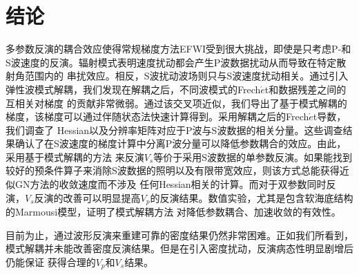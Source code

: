 \section{结论}
多参数反演的耦合效应使得常规梯度方法EFWI受到很大挑战，即使是只考虑P-和S波速度的反演。辐射模式表明速度扰动都会产生P波数据扰动从而导致在特定散射角范围内的
串扰效应。相反，S波扰动波场则只与S波速度扰动相关。通过引入弹性波模式解耦，我们发现在解耦之后，不同波模式的Frech{$\acute{e}$}t和数据残差之间的互相关对梯度
的贡献非常微弱。通过该交叉项近似，我们导出了基于模式解耦的梯度，该梯度可以通过伴随状态法快速计算得到。采用解耦之后的Frech{$\acute{e}$}t导数，我们调查了
Hessian以及分辨率矩阵对应于P波与S波数据的相关分量。这些调查结果确认了在S波速度的梯度计算中分离P波分量可以降低参数耦合的效应。由此，采用基于模式解耦的方法
来反演$V_s$等价于采用S波数据的单参数反演。如果能找到较好的预条件算子来消除S波数据的照明以及有限带宽效应，则该方式总能获得近似GN方法的收敛速度而不涉及
任何Hessian相关的计算。而对于双参数同时反演，$V_s$反演的改善可以明显提高$V_p$的反演结果。数值实验，尤其是包含软海底结构的Marmousi模型，证明了模式解耦方法
对降低参数耦合、加速收敛的有效性。

目前为止，通过波形反演来重建可靠的密度结果仍然非常困难。正如我们所看到，模式解耦并未能改善密度反演结果。但是在引入密度扰动，反演病态性明显剧增后仍能保证
获得合理的$V_p$和$V_s$结果。
